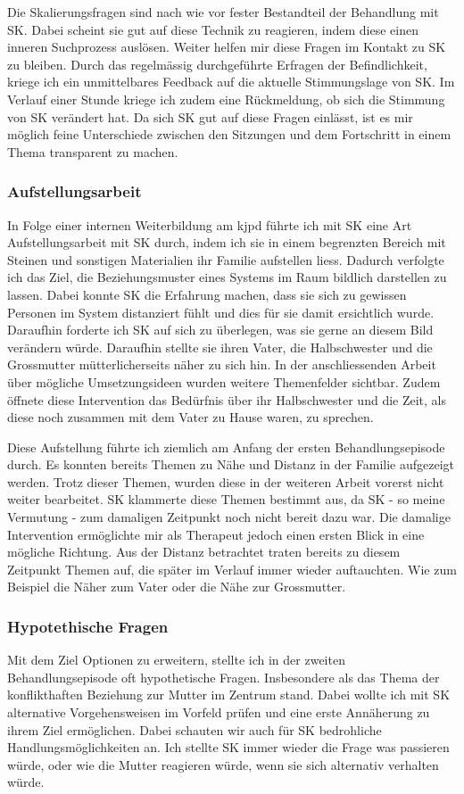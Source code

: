 Die Skalierungsfragen sind nach wie vor fester Bestandteil der Behandlung mit SK. Dabei scheint sie gut auf diese Technik zu reagieren, indem diese einen inneren Suchprozess auslösen. Weiter helfen mir diese Fragen im Kontakt zu SK zu bleiben. Durch das regelmässig durchgeführte Erfragen der Befindlichkeit, kriege ich ein unmittelbares Feedback auf die aktuelle Stimmungslage von SK. Im Verlauf einer Stunde kriege ich zudem eine Rückmeldung, ob sich die Stimmung von SK verändert hat. Da sich SK gut auf diese Fragen einlässt, ist es mir möglich feine Unterschiede zwischen den Sitzungen und dem Fortschritt in einem Thema transparent zu machen. 

\subsubsection{Aufstellungsarbeit}
In Folge einer internen Weiterbildung am \ac{kjpd} führte ich mit SK eine Art Aufstellungsarbeit mit SK durch, indem ich sie in einem begrenzten Bereich mit Steinen und sonstigen Materialien ihr Familie aufstellen liess. Dadurch verfolgte ich das Ziel, die Beziehungsmuster eines Systems im Raum bildlich darstellen zu lassen. Dabei konnte SK die Erfahrung machen, dass sie sich zu gewissen Personen im System distanziert fühlt und dies für sie damit ersichtlich wurde. Daraufhin forderte ich SK auf sich zu überlegen, was sie gerne an diesem Bild verändern würde. Daraufhin stellte sie ihren Vater, die Halbschwester und die Grossmutter mütterlicherseits näher zu sich hin. In der anschliessenden Arbeit über mögliche Umsetzungsideen wurden weitere Themenfelder sichtbar. Zudem öffnete diese Intervention das Bedürfnis über ihr Halbschwester und die Zeit, als diese noch zusammen mit dem Vater zu Hause waren, zu sprechen.

Diese Aufstellung führte ich ziemlich am Anfang der ersten Behandlungsepisode durch. Es konnten bereits Themen zu Nähe und Distanz in der Familie aufgezeigt werden. Trotz dieser Themen, wurden diese in der weiteren Arbeit vorerst nicht weiter bearbeitet. SK klammerte diese Themen bestimmt aus, da SK - so meine Vermutung - zum damaligen Zeitpunkt noch nicht bereit dazu war. Die damalige Intervention ermöglichte mir als Therapeut jedoch einen ersten Blick in eine mögliche Richtung. Aus der Distanz betrachtet traten bereits zu diesem Zeitpunkt Themen auf, die später im Verlauf immer wieder auftauchten. Wie zum Beispiel die Näher zum Vater oder die Nähe zur Grossmutter.

\subsubsection{Hypotethische Fragen}
Mit dem Ziel Optionen zu erweitern, stellte ich in der zweiten Behandlungsepisode oft hypothetische Fragen. Insbesondere als das Thema der konflikthaften Beziehung zur Mutter im Zentrum stand. Dabei wollte ich mit SK alternative Vorgehensweisen im Vorfeld prüfen und eine erste Annäherung zu ihrem Ziel ermöglichen. Dabei schauten wir auch für SK bedrohliche Handlungsmöglichkeiten an. Ich stellte SK immer wieder die Frage was passieren würde, oder wie die Mutter reagieren würde, wenn sie sich alternativ verhalten würde. 

